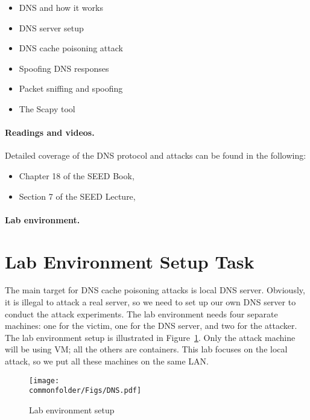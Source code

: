 \begin{itemize}[noitemsep]
\item DNS and how it works
\item DNS server setup
\item DNS cache poisoning attack
\item Spoofing DNS responses
\item Packet sniffing and spoofing
\item The Scapy tool
\end{itemize}


\paragraph{Readings and videos.}
Detailed coverage of the DNS protocol and attacks can be found in the following:

\begin{itemize}
\item Chapter 18 of the SEED Book, \seedbook
\item Section 7 of the SEED Lecture, \seedisvideo
\end{itemize}



\paragraph{Lab environment.} \seedenvironmentB





\section{Lab Environment Setup Task}
\label{sec:environment}


The main target for DNS cache poisoning attacks is
local DNS server.  Obviously, it
is illegal to attack a real server, so we need to set up our own DNS
server to  conduct the attack experiments. The lab
environment needs four separate machines:
one for the victim, one for the DNS server, and two for the attacker.
The lab environment setup is illustrated in Figure~\ref{dns:fig:environment}.
Only the attack machine will be using VM; all the others are containers.
This lab focuses on the local attack, so we put all these machines on 
the same LAN.


\begin{figure}[htb]
\centering
\texttt{[image: \\commonfolder/Figs/DNS.pdf]}
\caption{Lab environment setup}
\label{dns:fig:environment}
\end{figure}


